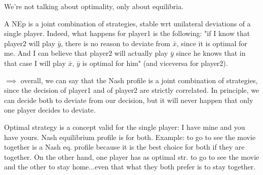 \bigskip
\noindent We're not talking about optimality, only about equilibria.

\noindent A NEp is a joint combination of strategies, stable wrt unilateral 
deviations of a single player. Indeed, what happens for player1 is the 
following: "if I know that player2 will play $\bar{y}$, there 
is no reason to deviate from $\bar{x}$, since it is optimal for me. 
And I can believe that player2 will actually play $\bar{y}$ since he knows 
that in that case I will play $\bar{x}$, $\bar{y}$ is optimal 
for him" (and viceversa for player2).

\bigskip
\noindent $\implies$ overall, we can say that the Nash profile is a joint 
combination of strategies, since the decision of player1 and of 
player2 are strictly correlated. In principle, we can decide both to 
deviate from our decision, but it will never happen that only one 
player decides to deviate.

\noindent Optimal strategy is a concept valid for the single player: I 
have mine and you have yours. Nash equilibrium profile is for both. Example: 
to go to see the movie together is a Nash eq. profile because it is 
the best choice for both if they are together. On the other hand, one 
player has as optimal str. to go to see the movie and the other to 
stay home...even that what they both prefer is to stay together.

